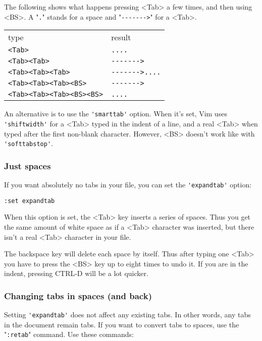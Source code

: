 The following shows what happens pressing <Tab> a few times, and then using <BS>.
A "\verb!.!" stands for a space and "\verb!------->!" for a <Tab>.

\begin{center} \begin{tabular}{l l}
type & result \\ 
\verb!<Tab>! & \verb!....! \\
\verb!<Tab><Tab>! & \verb!------->! \\
\verb!<Tab><Tab><Tab>! & \verb!------->....! \\
\verb!<Tab><Tab><Tab><BS>! & \verb!------->! \\
\verb!<Tab><Tab><Tab><BS><BS>! & \verb!....! \\		
\end{tabular} \end{center}

An alternative is to use the \verb!'smarttab'! option.
When it's set, Vim uses \verb!'shiftwidth'! for a <Tab> typed in the indent of a line, and a real <Tab> when typed after the first non-blank character.
However, <BS> doesn't work like with \verb!'softtabstop'!.

\subsubsection{Just spaces}
If you want absolutely no tabs in your file, you can set the \verb!'expandtab'! option:

\begin{Verbatim}[samepage=true]
 :set expandtab
\end{Verbatim}

When this option is set, the <Tab> key inserts a series of spaces.
Thus you get the same amount of white space as if a <Tab> character was inserted, but there isn't a real <Tab> character in your file.

The backspace key will delete each space by itself.
Thus after typing one <Tab> you have to press the <BS> key up to eight times to undo it.
If you are in the indent, pressing CTRL-D will be a lot quicker.

\subsubsection{Changing tabs in spaces (and back)}
Setting \verb!'expandtab'! does not affect any existing tabs.
In other words, any tabs in the document remain tabs.
If you want to convert tabs to spaces, use the "\verb!:retab!" command.
Use these commands:

